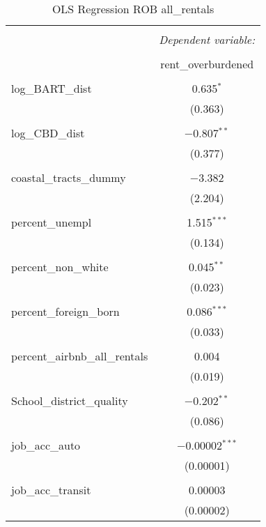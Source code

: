 \documentclass[10pt, letterpaper]{amsart}
\begin{document}
\begin{table}[H] \centering 
  \caption{OLS Regression ROB all\_rentals} 
  \label{} 
  \begin{tabular}{@{\extracolsep{5pt}}lc} 
    \\[-1.8ex]\hline 
    \hline \\[-1.8ex] 
    & \multicolumn{1}{c}{\textit{Dependent variable:}} \\ 
    \cline{2-2} 
    \\[-1.8ex] & rent\_overburdened \\ 
    \hline \\[-1.8ex] 
    log\_BART\_dist & 0.635$^{*}$ \\ 
    & (0.363) \\ 
    & \\ 
    log\_CBD\_dist & $-$0.807$^{**}$ \\ 
    & (0.377) \\ 
    & \\ 
    coastal\_tracts\_dummy & $-$3.382 \\ 
    & (2.204) \\ 
    & \\ 
    percent\_unempl & 1.515$^{***}$ \\ 
    & (0.134) \\ 
    & \\ 
    percent\_non\_white & 0.045$^{**}$ \\ 
    & (0.023) \\ 
    & \\ 
    percent\_foreign\_born & 0.086$^{***}$ \\ 
    & (0.033) \\ 
    & \\ 
    percent\_airbnb\_all\_rentals & 0.004 \\ 
    & (0.019) \\ 
    & \\ 
    School\_district\_quality & $-$0.202$^{**}$ \\ 
    & (0.086) \\ 
    & \\ 
    job\_acc\_auto & $-$0.00002$^{***}$ \\ 
    & (0.00001) \\ 
    & \\ 
    job\_acc\_transit & 0.00003 \\ 
    & (0.00002) \\ 

\end{tabular}
\end{table}
\end{document}
